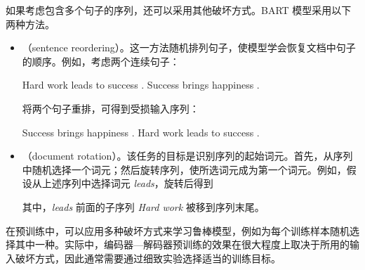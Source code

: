 如果考虑包含多个句子的序列，还可以采用其他破坏方式。BART 模型采用以下两种方法。

\begin{itemize}
\item \vspace{0.5em} （sentence reordering）。这一方法随机排列句子，使模型学会恢复文档中句子的顺序。例如，考虑两个连续句子：

    \begin{center}
    Hard work leads to success . Success brings happiness .
    \end{center}

    将两个句子重排，可得到受损输入序列：

    \begin{center}
    Success brings happiness . Hard work leads to success .
    \end{center}

\item \vspace{0.3em} （document rotation）。该任务的目标是识别序列的起始词元。首先，从序列中随机选择一个词元；然后旋转序列，使所选词元成为第一个词元。例如，假设从上述序列中选择词元 \textit{leads}，旋转后得到

    \begin{center}
    \end{center}

    \noindent 其中，\textit{leads} 前面的子序列 \textit{Hard work} 被移到序列末尾。

\end{itemize}
\vspace{0.5em}

在预训练中，可以应用多种破坏方式来学习鲁棒模型，例如为每个训练样本随机选择其中一种。实际中，编码器—解码器预训练的效果在很大程度上取决于所用的输入破坏方式，因此通常需要通过细致实验选择适当的训练目标。

